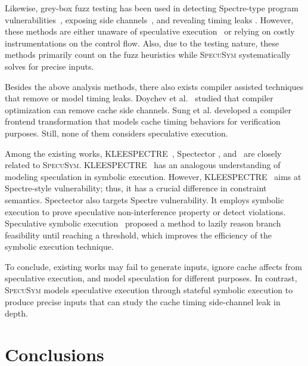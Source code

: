 \documentclass[sigconf]{acmart}
\newcommand\ignore[1]{}
\newcommand{\SpecuSym}{\textsc{SpecuSym} }
\begin{document}
\ignore{
It treats public data in a coarse-grained 
fashion and secret data in a finer-grained manner to balance the scalability 
and precision.
}


Likewise, grey-box fuzz testing has been used in detecting Spectre-type
\cite{KocherGGHHLMPSY19} program vulnerabilities~\cite{OleksenkoTSF19}, 
exposing side channels~\cite{NilizadehNP19}, and revealing timing leaks
\cite{HeEC19}. However, these methods are either unaware of speculative 
execution~\cite{NilizadehNP19,HeEC19} or relying on costly instrumentations 
on the control flow. Also, due to the testing nature, these methods primarily 
count on the fuzz heuristics while \SpecuSym systematically solves for precise 
inputs.


Besides the above analysis methods, there also exists compiler assisted 
techniques that remove or model timing leaks. Doychev et al.~\cite{DoychevK17} 
studied that compiler optimization can remove cache side channels. Sung et al.
\cite{SungPW18} developed a compiler frontend transformation that models cache
timing behaviors for verification purposes. Still, none of them considers
speculative execution.


Among the existing works, KLEESPECTRE~\cite{WangCBMR19}, Spectector
\cite{GuarnieriKMRS19}, and~\cite{ZhangCW12} are closely related to 
\textsc{SpecuSym}. KLEESPECTRE~\cite{WangCBMR19} has an analogous 
understanding of modeling speculation in symbolic execution. However, 
KLEESPECTRE~\cite{WangCBMR19} aims at Spectre-style vulnerability; 
thus, it has a crucial difference in constraint semantics. Spectector 
\cite{WangCBMR19} also targets Spectre vulnerability. It employs 
symbolic execution to prove speculative non-interference property or 
detect violations. Speculative symbolic execution~\cite{ZhangCW12} 
proposed a method to lazily reason branch feasibility until reaching 
a threshold, which improves the efficiency of the symbolic execution 
technique.


To conclude, existing works may fail to generate inputs, ignore cache 
affects from speculative execution, and model speculation for different 
purposes. In contrast, \SpecuSym models speculative execution through 
stateful symbolic execution to produce precise inputs that can study 
the cache timing side-channel leak in depth. 


\section{Conclusions}
\label{sec:conclusion}
\end{document}
